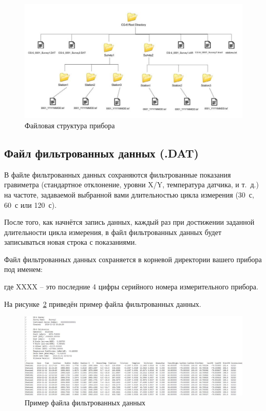 \begin{figure}[h]
  \centering
  \includegraphics[width=\textwidth]{figures/file_structure_of_a_cg6_autograv}
  \caption{Файловая структура прибора \cg{}}
  \label{fig:file_structure_of_a_cg6_autograv}
\end{figure}

\subsection[Файл фильтрованных данных]{Файл фильтрованных данных (.DAT)}

В файле фильтрованных данных сохраняются фильтрованные показания гравиметра
(стандартное отклонение, уровни X/Y, температура датчика, и т.~д.) на частоте,
задаваемой выбранной вами длительностью цикла измерения (30~с, 60~с или 120~с).

После того, как начнётся запись данных, каждый раз при достижении заданной
длительности цикла измерения, в файл фильтрованных данных будет записываться
новая строка с показаниями.

Файл фильтрованных данных сохраняется в корневой директории вашего прибора
\cg{} под именем:


где XXXX – это последние 4 цифры серийного номера измерительного прибора.

На рисунке~\ref{fig:sample_filtered_data_file_from_a_cg6_autograv} приведён
пример файла фильтрованных данных.

\begin{figure}[h]
  \centering
  \includegraphics[width=\textwidth]{figures/sample_filtered_data_file_from_a_cg6_autograv}
  \caption{Пример файла фильтрованных данных \cg{}}
  \label{fig:sample_filtered_data_file_from_a_cg6_autograv}
\end{figure}

